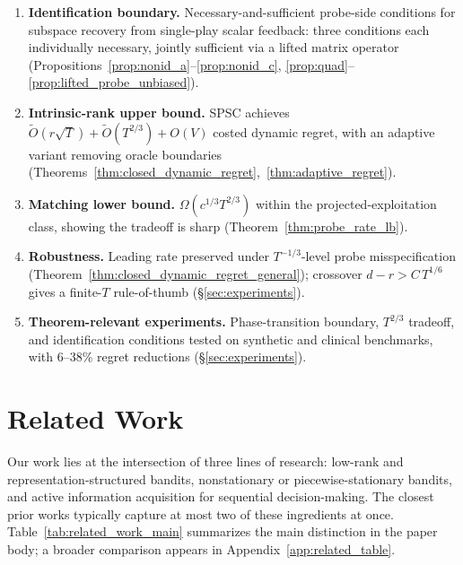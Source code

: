 \documentclass{article}
\begin{document}
  \begin{enumerate}[leftmargin=1.5em, itemsep=2pt]
  \item \textbf{Identification boundary.}
  Necessary-and-sufficient probe-side conditions for subspace recovery from single-play scalar feedback: three conditions each individually necessary, jointly sufficient via a lifted matrix operator
  (Propositions~\ref{prop:nonid_a}--\ref{prop:nonid_c}, \ref{prop:quad}--\ref{prop:lifted_probe_unbiased}).

  \item \textbf{Intrinsic-rank upper bound.}
  SPSC achieves $\widetilde{O}(r\sqrt{T}) + \widetilde{O}(T^{2/3}) + O(V)$ costed dynamic regret, with an adaptive variant removing oracle boundaries
  (Theorems~\ref{thm:closed_dynamic_regret},~\ref{thm:adaptive_regret}).

  \item \textbf{Matching lower bound.}
  $\Omega(c^{1/3}T^{2/3})$ within the projected-exploitation class, showing the tradeoff is sharp
  (Theorem~\ref{thm:probe_rate_lb}).

  \item \textbf{Robustness.}
  Leading rate preserved under $T^{-1/3}$-level probe misspecification (Theorem~\ref{thm:closed_dynamic_regret_general}); crossover $d - r > C\,T^{1/6}$ gives a finite-$T$ rule-of-thumb (\S\ref{sec:experiments}).

  \item \textbf{Theorem-relevant experiments.}
  Phase-transition boundary, $T^{2/3}$ tradeoff, and identification conditions tested on synthetic and clinical benchmarks, with 6--38\% regret reductions (\S\ref{sec:experiments}).
  \end{enumerate}

\section{Related Work}
\label{sec:related}

Our work lies at the intersection of three lines of research: low-rank and representation-structured bandits, nonstationary or piecewise-stationary bandits, and active information acquisition for sequential decision-making.
The closest prior works typically capture at most two of these ingredients at once.
Table~\ref{tab:related_work_main} summarizes the main distinction in the paper body; a broader comparison appears in Appendix~\ref{app:related_table}.
\end{document}
